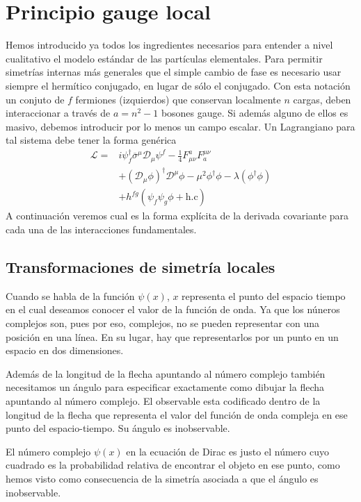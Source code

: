 
\chapter{Principio gauge local}
\label{cha:princ-gauge-local-1}

Hemos introducido ya todos los ingredientes necesarios para entender a nivel cualitativo el modelo estándar de las partículas elementales. Para permitir simetrías internas más generales que el simple cambio de fase es necesario usar siempre el hermítico conjugado, en lugar de sólo el conjugado. Con esta notación un conjuto de $f$ fermiones (izquierdos) que conservan localmente $n$ cargas, deben interaccionar a través de $a=n^2-1$ bosones gauge. Si además alguno de ellos es masivo, debemos introducir por lo menos un campo escalar. Un Lagrangiano para tal sistema debe tener la forma genérica
\begin{align}
  \mathcal{L}=&i \psi^{\dagger}_f \overline{\sigma}^{\mu}\mathcal{D}_{\mu} \psi^f-\frac{1}{4}F_{\mu\nu}^{a} F^{\mu\nu}_a \nonumber\\
              &+\left( \mathcal{D}_{\mu}\phi \right)^{\dagger} \mathcal{D}^{\mu}\phi-\mu^2 \phi^{\dagger} \phi-\lambda \left(\phi^{\dagger} \phi  \right) \nonumber\\
              &+h^{fg} \left( \psi_f\psi_g \phi + \text{h.c} \right)
 \end{align}
 A continuación veremos cual es la forma explícita de la derivada covariante para cada una de las interacciones fundamentales.

\section{Transformaciones de simetría locales}
Cuando se habla de la función $\psi(x)$, $x$ representa el punto del
espacio tiempo en el cual deseamos conocer el valor de la función de
onda.  Ya que los núneros complejos son, pues por eso, complejos, no
se pueden representar con una posición en una línea. En su lugar, hay
que representarlos por un punto en un espacio en dos dimensiones.

Además de la longitud de la flecha apuntando al número complejo también necesitamos un ángulo para especificar exactamente como dibujar la flecha apuntando al número complejo. El observable esta codificado dentro de la longitud de la flecha que representa el valor del función de onda compleja en ese punto del espacio-tiempo. Su ángulo es inobservable.

El número complejo $\psi(x)$  en la ecuación de Dirac es justo el número cuyo cuadrado es la probabilidad relativa de encontrar el objeto en ese punto, como hemos visto como consecuencia de la simetría asociada a que el ángulo es inobservable.

